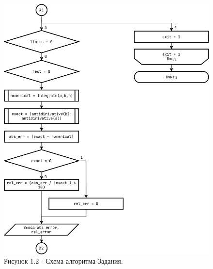 \documentclass[oneside,a4paper,14pt]{extarticle}
\begin{document}
\begin{figure}[!ht]
	\centering
	\includegraphics[height=0.9\textheight]{pics/flowchart_p2.png}
	\caption*{Рисунок 1.2 - Схема алгоритма Задания.}
\end{figure}
\end{document}
